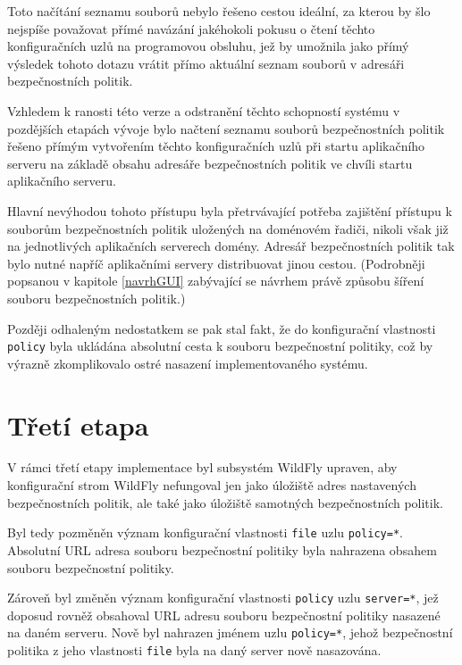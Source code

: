 Toto načítání seznamu souborů nebylo řešeno cestou ideální, za kterou by šlo nejspíše považovat přímé navázání jakéhokoli pokusu o čtení těchto konfiguračních uzlů na programovou obsluhu, jež by umožnila jako přímý výsledek tohoto dotazu vrátit přímo aktuální seznam souborů v adresáři bezpečnostních politik.

Vzhledem k ranosti této verze a odstranění těchto schopností systému v pozdějších etapách vývoje bylo načtení seznamu souborů bezpečnostních politik řešeno přímým vytvořením těchto konfiguračních uzlů při startu aplikačního serveru na základě obsahu adresáře bezpečnostních politik ve chvíli startu aplikačního serveru.

Hlavní nevýhodou tohoto přístupu byla přetrvávající potřeba zajištění přístupu k souborům bezpečnostních politik uložených na doménovém řadiči, nikoli však již na jednotlivých aplikačních serverech domény. Adresář bezpečnostních politik tak bylo nutné napříč aplikačními servery distribuovat jinou cestou. (Podrobněji popsanou v kapitole \ref{navrhGUI} zabývající se návrhem právě způsobu šíření souboru bezpečnostních politik.)

Později odhaleným nedostatkem se pak stal fakt, že do konfigurační vlastnosti {\tt policy} byla ukládána absolutní cesta k souboru bezpečnostní politiky, což by výrazně zkomplikovalo ostré nasazení implementovaného systému.

\section{Třetí etapa}

V rámci třetí etapy implementace byl subsystém WildFly upraven, aby konfigurační strom WildFly nefungoval jen jako úložiště adres nastavených bezpečnostních politik, ale také jako úložiště samotných bezpečnostních politik.

Byl tedy pozměněn význam konfigurační vlastnosti {\tt file} uzlu {\tt policy=*}. Absolutní URL adresa souboru  bezpečnostní politiky byla nahrazena obsahem souboru bezpečnostní politiky.

Zároveň byl změněn význam konfigurační vlastnosti {\tt policy} uzlu {\tt server=*}, jež doposud rovněž obsahoval URL adresu souboru bezpečnostní politiky nasazené na daném serveru. Nově byl nahrazen jménem uzlu {\tt policy=*}, jehož bezpečnostní politika z jeho vlastnosti {\tt file} byla na daný server nově nasazována.

